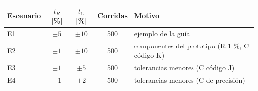 \begin{tabular}{@{}lcccl@{}}
\toprule
Escenario & $t_R$ [\%] & $t_C$ [\%] & Corridas & Motivo \\
\midrule
E1 & $\pm5$ & $\pm10$ & 500 & ejemplo de la guía \\
E2 & $\pm1$ & $\pm10$ & 500 & componentes del prototipo (R 1 \%, C código K) \\
E3 & $\pm1$ & $\pm5$ & 500 & tolerancias menores (C código J) \\
E4 & $\pm1$ & $\pm2$ & 500 & tolerancias menores (C de precisión) \\
\bottomrule
\end{tabular}
